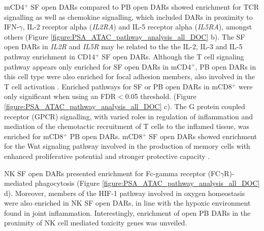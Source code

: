 mCD4$^+$ SF open DARs compared to PB open DARs showed enrichment for TCR signalling as well as chemokine signalling, which included DARs in proximity to IFN-$\gamma$, IL-2 receptor alpha (\textit{IL2RA}) and IL-5 receptor alpha (\textit{IL5RA}), amongst others (Figure \ref{figure:PSA_ATAC_pathway_analysis_all_DOC} b). The SF open DARs in \textit{IL2R} and \textit{IL5R} may be related to the the IL-2, IL-3 and IL-5 pathway enrichment in CD14$^+$ SF open DARs. Although the T cell signaling pathway appears only enriched for SF open DARs in mCD4$^+$, PB open DARs in this cell type were also enriched for focal adhesion members, also involved in the T cell activation \parencite{Dustin2001}. Enriched pathways for SF or PB open DARs in mCD8$^+$ were only significant when using an FDR$<$0.05 threshold. (Figure \ref{figure:PSA_ATAC_pathway_analysis_all_DOC} c). The G protein coupled receptor (GPCR) signalling, with varied roles in regulation of inflammation and mediation of the chemotactic recruitment of T cells to the inflamed tissue, was enriched for mCD8$^+$ PB open DARs. mCD8$^+$ SF open DARs showed enrichment for the Wnt signaling pathway involved in the production of memory cells with enhanced proliferative potential and stronger protective capacity \parencite{Boudousquie2014,}. 

NK SF open DARs presented enrichment for Fc-gamma receptor (FC$\gamma$R)-mediated phagocytosis (Figure \ref{figure:PSA_ATAC_pathway_analysis_all_DOC} d). Moreover, members of the HIF-1 pathway involved in oxygen homeostasis were also enriched in NK SF open DARs, in line with the hypoxic environment found in joint inflammation. Interestingly, enrichment of open PB DARs in the proximity of NK cell mediated toxicity genes was unveiled. 

